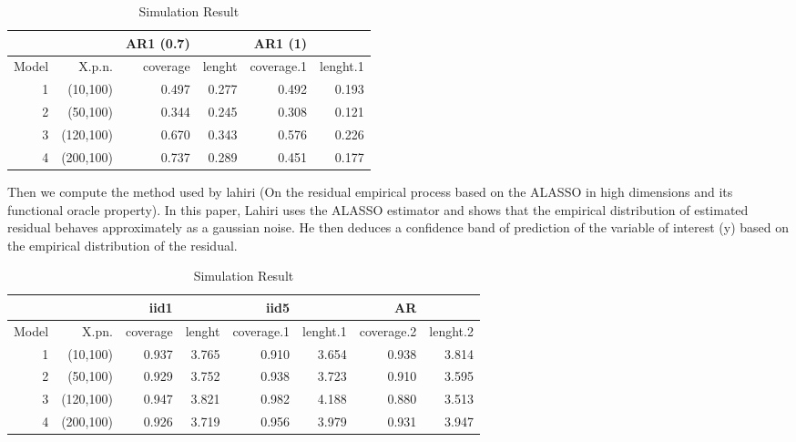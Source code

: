 \documentclass[11pt,oneside, a4paper]{amsart}\usepackage[]{graphicx}\usepackage[]{color}
\begin{document}
\begin{table}[ht]
\centering
\caption{Simulation Result} 
\label{Test_table}
{\footnotesize
\begin{tabular}{|r|r|rr|rr|}
  \toprule 
    &  & AR1 (0.7) &  & AR1 (1) &  \\
 \midrule 
Model & X.p.n. & coverage & lenght & coverage.1 & lenght.1 \\ 
    1 & (10,100) & 0.497 & 0.277 & 0.492 & 0.193 \\ 
     2 & (50,100) & 0.344 & 0.245 & 0.308 & 0.121 \\ 
     3 & (120,100) & 0.670 & 0.343 & 0.576 & 0.226 \\ 
     4 & (200,100) & 0.737 & 0.289 & 0.451 & 0.177 \\ 
   \bottomrule 
\end{tabular}
}
\end{table}








Then we compute the method used by lahiri (On the residual empirical process based on the ALASSO in high dimensions and its functional oracle property). In this paper, Lahiri uses the ALASSO estimator and shows that the empirical distribution of estimated residual behaves approximately as a gaussian noise. He then deduces a confidence band of prediction of the variable of interest (y) based on the empirical distribution of the residual.




\begin{table}[ht]
\centering
\caption{Simulation Result} 
\label{Test_table}
{\footnotesize
\begin{tabular}{|r|r|rr|rr|rr|}
  \toprule 
    &  & iid1 &  & iid5 & & AR & \\
 \midrule 
Model & X.pn. & coverage & lenght & coverage.1 & lenght.1 & coverage.2 & lenght.2 \\ 
    1 & (10,100) & 0.937 & 3.765 & 0.910 & 3.654 & 0.938 & 3.814 \\ 
     2 & (50,100) & 0.929 & 3.752 & 0.938 & 3.723 & 0.910 & 3.595 \\ 
     3 & (120,100) & 0.947 & 3.821 & 0.982 & 4.188 & 0.880 & 3.513 \\ 
     4 & (200,100) & 0.926 & 3.719 & 0.956 & 3.979 & 0.931 & 3.947 \\ 
   \bottomrule 
\end{tabular}
}
\end{table}
\end{document}
